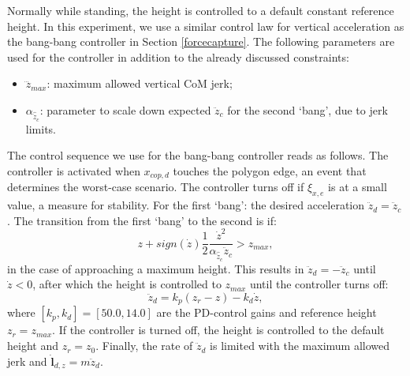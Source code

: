 \documentclass[letterpaper, 10 pt, conference]{ieeeconf}  %
\newcommand{\zmax}{z_{max}}
\newcommand{\rcmpd}{x_{cop,d}}
\newcommand{\icpe}{\xi_{x,e}}
\begin{document}
Normally while standing, the height is controlled to a default constant reference height. In this experiment, we use a similar control law for vertical acceleration as the bang-bang controller in Section \ref{forcecapture}. The following parameters are used for the controller in addition to the already discussed constraints:
\begin{itemize}
	\item $\dddot{z}_{max}$: maximum allowed vertical CoM jerk;
	\item $\alpha_{\hat{\ddot{z}}_{c}}$: parameter to scale down expected $\ddot{z}_c$ for the second `bang', due to jerk limits.
\end{itemize}

The control sequence we use for the bang-bang controller reads as follows. The controller is activated when $\rcmpd$ touches the polygon edge, an event that determines the worst-case scenario. The controller turns off if $\icpe$ is at a small value, a measure for stability. For the first `bang': the desired acceleration $\ddot{z}_d=\ddot{z}_c$. The transition from the first `bang' to the second is if:
\begin{equation}
	z+sign(\dot{z})\frac{1}{2}\frac{\dot{z}^2}{\alpha_{\hat{\ddot{z}}_{c}}\ddot{z}_{c}} >\zmax,
\end{equation}
in the case of approaching a maximum height. This results in $\ddot{z}_d=-\ddot{z}_c$ until $\dot{z}<0$, after which the height is controlled to $\zmax$ until the controller turns off:
\begin{equation}
	\ddot{z}_d = k_p(z_r-z)-k_d\dot{z},
\end{equation}
where $[k_p,k_d]=[50.0,14.0]$ are the PD-control gains and reference height $z_r= \zmax$. If the controller is turned off, the height is controlled to the default height and $z_r=z_0$. Finally, the rate of $\ddot{z}_d$ is limited with the maximum allowed jerk and $\dot{\mathbf{l}}_{d,z}=m\ddot{z}_d$.
\end{document}
